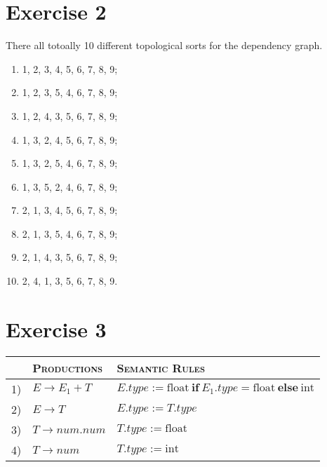 \documentclass{CompilerAssignment}
\begin{document}
\section{Exercise 2}

There all totoally 10 different topological sorts for the dependency graph.

\begin{enumerate}[label=\arabic*: ]
    \item 1, 2, 3, 4, 5, 6, 7, 8, 9;
    \item 1, 2, 3, 5, 4, 6, 7, 8, 9;
    \item 1, 2, 4, 3, 5, 6, 7, 8, 9;
    \item 1, 3, 2, 4, 5, 6, 7, 8, 9;
    \item 1, 3, 2, 5, 4, 6, 7, 8, 9;
    \item 1, 3, 5, 2, 4, 6, 7, 8, 9;
    \item 2, 1, 3, 4, 5, 6, 7, 8, 9;
    \item 2, 1, 3, 5, 4, 6, 7, 8, 9;
    \item 2, 1, 4, 3, 5, 6, 7, 8, 9;
    \item 2, 4, 1, 3, 5, 6, 7, 8, 9.
\end{enumerate}

\section{Exercise 3}

\begin{table}[!h]
    \centering
    \begin{tabular}{cl|l}
        \hline \hline
        & \textsc{Productions} & \textsc{Semantic Rules} \\ \hline
        1) & $E \rightarrow E_1 + T$ & $ E.type:=\mathrm{float}\ \mathbf{if}\ E_1.type=\mathrm{float}\ \mathbf{else}\ \mathrm{int} $ \\
        2) & $E \rightarrow T$ & $ E.type := T.type $ \\
        3) & $T \rightarrow num.num$ & $ T.type:=\mathrm{float} $ \\
        4) & $T \rightarrow num$ & $ T.type:=\mathrm{int} $\\
        \hline
    \end{tabular}
\end{table}
\end{document}
